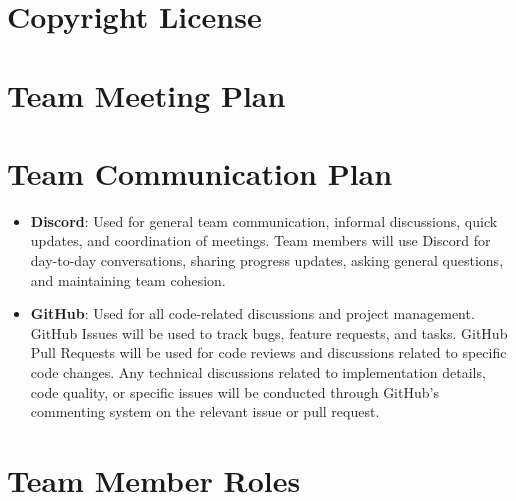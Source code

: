 \documentclass{article}
\begin{document}
\section{Copyright License}


\section{Team Meeting Plan}






\section{Team Communication Plan}

\begin{itemize}
  \item \textbf{Discord}: Used for general team communication, informal discussions, quick updates, and coordination of meetings. Team members will use Discord for day-to-day conversations, sharing progress updates, asking general questions, and maintaining team cohesion.
  \item \textbf{GitHub}: Used for all code-related discussions and project management. GitHub Issues will be used to track bugs, feature requests, and tasks. GitHub Pull Requests will be used for code reviews and discussions related to specific code changes. Any technical discussions related to implementation details, code quality, or specific issues will be conducted through GitHub's commenting system on the relevant issue or pull request.
\end{itemize}


\section{Team Member Roles}
\end{document}
